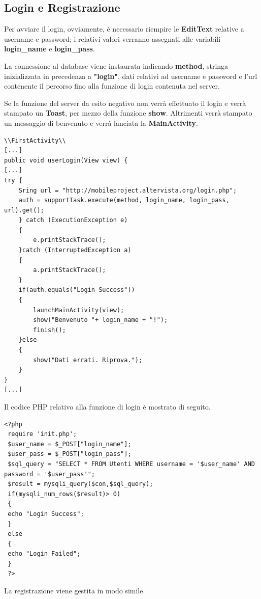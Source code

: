 \documentclass[a4paper, 50pt, twoside]{article}
\begin{document}
\subsection{Login e Registrazione}
Per avviare il login, ovviamente, è necessario riempire le \textbf{EditText} relative a username e password; i relativi valori verranno assegnati alle variabili \textbf{login\_name} e \textbf{login\_pass}.

La connessione al database viene instaurata indicando \textbf{method}, stringa inizializzata in precedenza a \textbf{"login"}, dati relativi ad username e password e l'url contenente il percorso fino alla funzione di login contenuta nel server.

Se la funzione del server da esito negativo non verrà effettuato il login e verrà stampato un \textbf{Toast}, per mezzo della funzione \textbf{show}. Altrimenti verrà stampato un messaggio di benvenuto e verrà lanciata la \textbf{MainActivity}.
\begin{lstlisting}
\\FirstActivity\\
[...]
public void userLogin(View view) {
[...]
try {
	Sring url = "http://mobileproject.altervista.org/login.php";
	auth = supportTask.execute(method, login_name, login_pass, url).get();
	} catch (ExecutionException e)
	{
		e.printStackTrace();
	}catch (InterruptedException a)
	{
		a.printStackTrace();
	}
	if(auth.equals("Login Success"))
	{
		launchMainActivity(view);
		show("Benvenuto "+ login_name + "!");
		finish();
	}else
	{
		show("Dati errati. Riprova.");
	}
}
[...]
\end{lstlisting}
Il codice PHP relativo alla funzione di login è mostrato di seguito.
\begin{lstlisting}
<?php
 require 'init.php';
 $user_name = $_POST["login_name"];  
 $user_pass = $_POST["login_pass"];  
 $sql_query = "SELECT * FROM Utenti WHERE username = '$user_name' AND 
password = '$user_pass'";  
 $result = mysqli_query($con,$sql_query);  
 if(mysqli_num_rows($result)> 0)  
 {    
 echo "Login Success";  
 }  
 else  
 {
 echo "Login Failed";  
 }  
 ?>
\end{lstlisting}
La registrazione viene gestita in modo simile.
\end{document}
